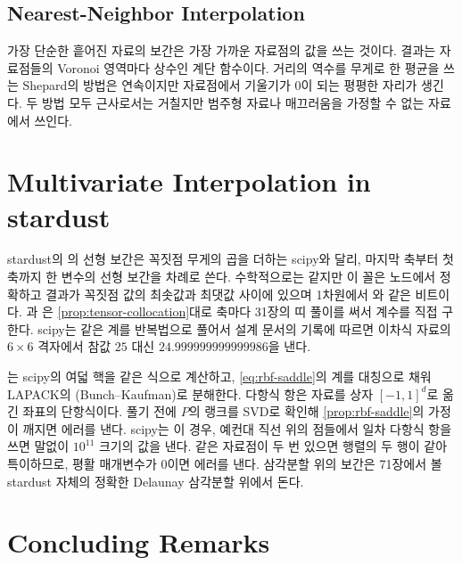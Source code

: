 \subsection{Nearest-Neighbor Interpolation}

가장 단순한 흩어진 자료의 보간은 가장 가까운 자료점의 값을 쓰는 것이다. 결과는 자료점들의 Voronoi 영역마다 상수인 계단 함수이다. 거리의 역수를 무게로 한 평균을 쓰는 Shepard의 방법은 연속이지만 자료점에서 기울기가 $0$이 되는 평평한 자리가 생긴다\cite{shepard1968}. 두 방법 모두 근사로서는 거칠지만 범주형 자료나 매끄러움을 가정할 수 없는 자료에서 쓰인다.

\section{Multivariate Interpolation in stardust}
\label{sec:multivariate-stardust}

\begin{instardust}
stardust의 의 선형 보간은 꼭짓점 무게의 곱을 더하는 scipy와 달리, 마지막 축부터 첫 축까지 한 변수의 선형 보간을 차례로 쓴다. 수학적으로는 같지만 이 꼴은 노드에서 정확하고 결과가 꼭짓점 값의 최솟값과 최댓값 사이에 있으며 1차원에서 와 같은 비트이다. 과 은 \cref{prop:tensor-collocation}대로 축마다 31장의 띠 풀이를 써서 계수를 직접 구한다. scipy는 같은 계를 반복법으로 풀어서 설계 문서의 기록에 따르면 이차식 자료의 $6\times6$ 격자에서 참값 $25$ 대신 $24.999999999999986$을 낸다.
\end{instardust}

\begin{instardust}
는 scipy의 여덟 핵을 같은 식으로 계산하고, \eqref{eq:rbf-saddle}의 계를 대칭으로 채워 LAPACK의 (Bunch--Kaufman)로 분해한다. 다항식 항은 자료를 상자 $[-1,1]^d$로 옮긴 좌표의 단항식이다. 풀기 전에 $P$의 랭크를 SVD로 확인해 \cref{prop:rbf-saddle}의 가정이 깨지면 에러를 낸다. scipy는 이 경우, 예컨대 직선 위의 점들에서 일차 다항식 항을 쓰면 말없이 $10^{11}$ 크기의 값을 낸다. 같은 자료점이 두 번 있으면 행렬의 두 행이 같아 특이하므로, 평활 매개변수가 $0$이면 에러를 낸다. 삼각분할 위의 보간은 71장에서 볼 stardust 자체의 정확한 Delaunay 삼각분할 위에서 돈다.
\end{instardust}

\section{Concluding Remarks}

